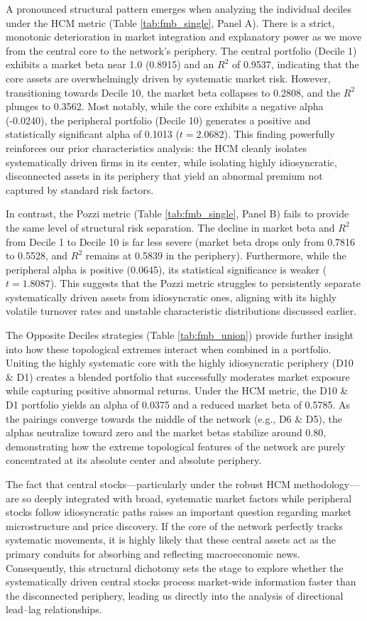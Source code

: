 \documentclass[fleqn]{rbfin}
\begin{document}
A pronounced structural pattern emerges when analyzing the individual deciles under the HCM metric (Table \ref{tab:fmb_single}, Panel A). There is a strict, monotonic deterioration in market integration and explanatory power as we move from the central core to the network's periphery. The central portfolio (Decile 1) exhibits a market beta near 1.0 (0.8915) and an $R^2$ of 0.9537, indicating that the core assets are overwhelmingly driven by systematic market risk. However, transitioning towards Decile 10, the market beta collapses to 0.2808, and the $R^2$ plunges to 0.3562. Most notably, while the core exhibits a negative alpha (-0.0240), the peripheral portfolio (Decile 10) generates a positive and statistically significant alpha of 0.1013 ($t = 2.0682$). This finding powerfully reinforces our prior characteristics analysis: the HCM cleanly isolates systematically driven firms in its center, while isolating highly idiosyncratic, disconnected assets in its periphery that yield an abnormal premium not captured by standard risk factors.

In contrast, the Pozzi metric (Table \ref{tab:fmb_single}, Panel B) fails to provide the same level of structural risk separation. The decline in market beta and $R^2$ from Decile 1 to Decile 10 is far less severe (market beta drops only from 0.7816 to 0.5528, and $R^2$ remains at 0.5839 in the periphery). Furthermore, while the peripheral alpha is positive (0.0645), its statistical significance is weaker ($t = 1.8087$). This suggests that the Pozzi metric struggles to persistently separate systematically driven assets from idiosyncratic ones, aligning with its highly volatile turnover rates and unstable characteristic distributions discussed earlier. 

The Opposite Deciles strategies (Table \ref{tab:fmb_union}) provide further insight into how these topological extremes interact when combined in a portfolio. Uniting the highly systematic core with the highly idiosyncratic periphery (D10 \& D1) creates a blended portfolio that successfully moderates market exposure while capturing positive abnormal returns. Under the HCM metric, the D10 \& D1 portfolio yields an alpha of 0.0375 and a reduced market beta of 0.5785. As the pairings converge towards the middle of the network (e.g., D6 \& D5), the alphas neutralize toward zero and the market betas stabilize around 0.80, demonstrating how the extreme topological features of the network are purely concentrated at its absolute center and absolute periphery.

The fact that central stocks—particularly under the robust HCM methodology—are so deeply integrated with broad, systematic market factors while peripheral stocks follow idiosyncratic paths raises an important question regarding market microstructure and price discovery. If the core of the network perfectly tracks systematic movements, it is highly likely that these central assets act as the primary conduits for absorbing and reflecting macroeconomic news. Consequently, this structural dichotomy sets the stage to explore whether the systematically driven central stocks process market-wide information faster than the disconnected periphery, leading us directly into the analysis of directional lead--lag relationships.
\end{document}
